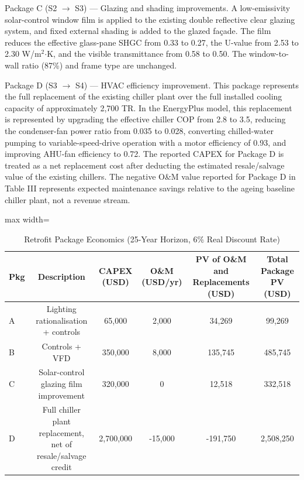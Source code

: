\documentclass[journal,fleqn]{IEEEtran}
\renewcommand{\arraystretch}{1.08}
\begin{document}
Package C (S2 $\rightarrow$ S3) --- Glazing and shading improvements. A low-emissivity solar-control window film is applied to the existing double reflective clear glazing system, and fixed external shading is added to the glazed façade. The film reduces the effective glass-pane SHGC from 0.33 to 0.27, the U-value from 2.53 to 2.30 W/m$^{2}$$\cdot$K, and the visible transmittance from 0.58 to 0.50. The window-to-wall ratio (87\%) and frame type are unchanged.


Package D (S3 $\rightarrow$ S4) --- HVAC efficiency improvement. This package represents the full replacement of the existing chiller plant over the full installed cooling capacity of approximately 2,700 TR. In the EnergyPlus model, this replacement is represented by upgrading the effective chiller COP from 2.8 to 3.5, reducing the condenser-fan power ratio from 0.035 to 0.028, converting chilled-water pumping to variable-speed-drive operation with a motor efficiency of 0.93, and improving AHU-fan efficiency to 0.72. The reported CAPEX for Package D is treated as a net replacement cost after deducting the estimated resale/salvage value of the existing chillers. The negative O\&M value reported for Package D in Table III represents expected maintenance savings relative to the ageing baseline chiller plant, not a revenue stream.


\begin{table}[!t]
\caption{Retrofit Package Economics (25-Year Horizon, 6\% Real Discount Rate)}
\label{tab:03}
\centering
\scriptsize
\setlength{\tabcolsep}{4pt}
\renewcommand{\arraystretch}{1.16}
\begin{adjustbox}{max width=\textwidth}
\begin{tabular}{@{}lccccc@{}}
\toprule
\textbf{Pkg} & \textbf{Description} & \textbf{CAPEX (USD)} & \textbf{O\&M (USD/yr)} & \textbf{PV of O\&M and Replacements (USD)} & \textbf{Total Package PV (USD)} \\
\midrule
A & Lighting rationalisation + controls & 65,000 & 2,000 & 34,269 & 99,269 \\
B & Controls + VFD & 350,000 & 8,000 & 135,745 & 485,745 \\
C & Solar-control glazing film improvement & 320,000 & 0 & 12,518 & 332,518 \\
D & Full chiller plant replacement, net of resale/salvage credit & 2,700,000 & -15,000 & -191,750 & 2,508,250 \\
\bottomrule
\end{tabular}
\end{adjustbox}
\end{table}
\end{document}
